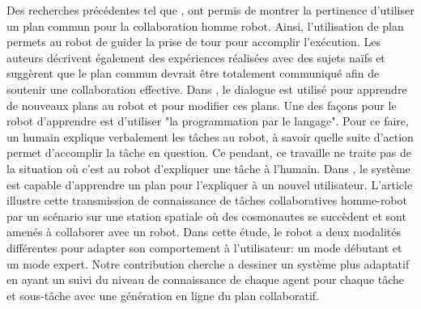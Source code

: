 \documentclass[a4paper,11pt,twoside]{StyleThese}
\begin{document}
Des recherches précédentes tel que \cite{Lallee2013}, ont permis de montrer la pertinence d'utiliser un plan commun pour la collaboration homme robot. Ainsi, l'utilisation de plan permets au robot de guider la prise de tour pour accomplir l'exécution. Les auteurs décrivent également des expériences réalisées avec des sujets naïfs et suggèrent que le plan commun devrait être totalement communiqué afin de soutenir une collaboration effective. Dans \cite{Petit2012}, le dialogue est utilisé pour apprendre de nouveaux plans au robot et pour modifier ces plans. Une des façons pour le robot d'apprendre est d'utiliser "la programmation par le langage". Pour ce faire, un humain explique verbalement les tâches au robot, à savoir quelle suite d'action permet d'accomplir la tâche en question. Ce pendant, ce travaille ne traite pas de la situation où c'est au robot d'expliquer une tâche à l'humain.
Dans \cite{Sorce2015}, le système est capable d'apprendre un plan pour l'expliquer à un nouvel utilisateur. L'article illustre cette transmission de connaissance de tâches collaboratives homme-robot par un scénario sur une station spatiale où des cosmonautes se succèdent et sont amenés à collaborer avec un robot. Dans cette étude, le robot a deux modalités différentes pour adapter son comportement à l'utilisateur: un mode débutant et un mode expert.
Notre contribution cherche a dessiner un système plus adaptatif en ayant un suivi du niveau de connaissance de chaque agent pour chaque tâche et sous-tâche avec une génération en ligne du plan collaboratif.


\end{document}
